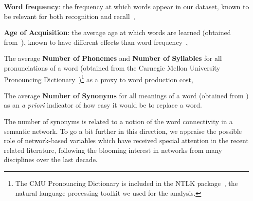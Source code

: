 \begin{APAitemize}
    \item \textbf{Word frequency}: the frequency at which words appear in our dataset, known to be relevant for both recognition and recall~\citep{gregg1976word},
    \item \textbf{Age of Acquisition}: the average age at which words are learned (obtained from~\citet{Kuperman12}), known to have different effects than word frequency~\citep{morrison1995roles,dewhurst1998separate},
    \item The average \textbf{Number of Phonemes} and \textbf{Number of Syllables} for all pronunciations of a word (obtained from the Carnegie Mellon University Pronouncing Dictionary~\citep{Weide98})\footnote{The CMU Pronouncing Dictionary is included in the NTLK package~\citep{Bird09}, the natural language processing toolkit we used for the analysis.} as a proxy to word production cost,
    \item The average \textbf{Number of Synonyms} for all meanings of a word (obtained from \citet{WordNet10}) as an \emph{a priori} indicator of how easy it would be to replace a word.
\end{APAitemize}


The number of synonyms is related to a notion of the word connectivity in a semantic network.  To go a bit further in this direction, we appraise the possible role of network-based variables which have received special attention in the recent related literature, following the blooming interest in networks from many disciplines over the last decade. 

